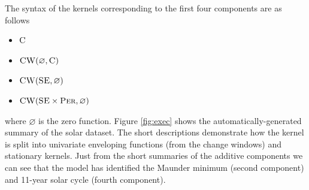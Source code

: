 \documentclass{article}
\let\emptyset\varnothing
\begin{document}
The syntax of the kernels corresponding to the first four components are as follows
\begin{itemize}
  \item ${\textsc{C}}$
  \item $\kCW(\emptyset, \kC)$
  \item $\kCW(\kSE, \emptyset)$
  \item $\kCW(\kSE \times \kPer, \emptyset)$
\end{itemize}
where $\emptyset$ is the zero function.
Figure \ref{fig:exec} shows the automatically-generated summary of the solar dataset.
The short descriptions demonstrate how the kernel is split into univariate enveloping functions (from the change windows) and stationary kernels.
%
%
Just from the short summaries of the additive components we can see that the model has identified the Maunder minimum (second component) and 11-year solar cycle (fourth component).
\end{document}
